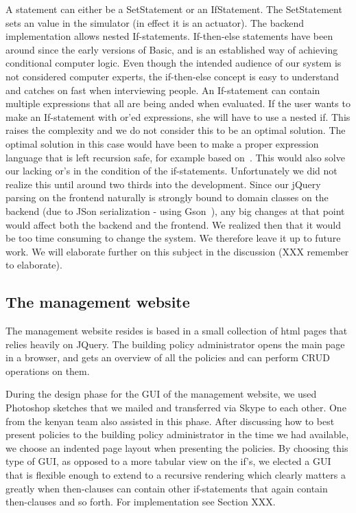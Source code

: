 A statement can either be a SetStatement or an IfStatement. The SetStatement sets an value in the simulator (in effect it is an actuator). The backend implementation allows nested If-statements. If-then-else statements have been around since the early versions of Basic, and is an established way of achieving conditional computer logic. Even though the intended audience of our system is not considered computer experts, the if-then-else concept is easy to understand and catches on fast when interviewing people. An If-statement can contain multiple expressions that all are being anded when evaluated. If the user wants to make an If-statement with or'ed expressions, she will have to use a nested if. This raises the complexity and we do not consider this to be an optimal solution. The optimal solution in this case would have been to make a proper expression language that is left recursion safe, for example based on~\cite{left-recursion}. This would also solve our lacking or's in the condition of the if-statements. Unfortunately we did not realize this until around two thirds into the development. Since our jQuery~\cite{jquery} parsing on the frontend naturally is strongly bound to domain classes on the backend (due to JSon serialization - using Gson~\cite{gson}), any big changes at that point would affect both the backend and the frontend. We realized then that it would be too time consuming to change the system. We therefore leave it up to future work. 
We will elaborate further on this subject in the discussion (XXX remember to elaborate). 

\subsection{The management website}
The management website resides is based in a small collection of html pages that relies heavily on JQuery. The building policy administrator opens the main page in a browser, and gets an overview of all the policies and can perform CRUD operations on them.

During the design phase for the GUI of the management website, we used Photoshop sketches that we mailed and transferred via Skype to each other. One from the kenyan team also assisted in this phase. After discussing how to best present policies to the building policy administrator in the time we had available, we choose an indented page layout when presenting the policies. By choosing this type of GUI, as opposed to a more tabular view on the if's, we elected a GUI that is flexible enough to extend to a recursive rendering which clearly matters a greatly when then-clauses can contain other if-statements that again contain then-clauses and so forth. For implementation see Section XXX.

